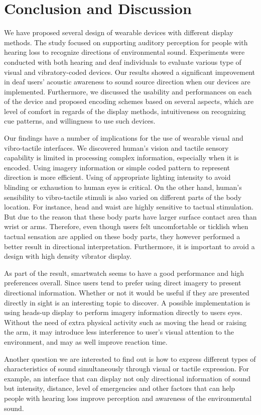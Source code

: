 \documentclass{sigchi}
\begin{document}
\section{Conclusion and Discussion}
We have proposed several design of wearable devices with different display methods. The study focused on supporting auditory perception for people with hearing loss to recognize directions of environmental sound. Experiments were conducted with both hearing and deaf individuals to evaluate various type of visual and vibratory-coded devices. Our results showed a significant improvement in deaf users' acoustic awareness to sound source direction when our devices are implemented. Furthermore, we discussed the usability and performances on each of the device and proposed encoding schemes based on several aspects, which are level of comfort in regards of the display methods, intuitiveness on recognizing cue patterns, and willingness to use such devices.

Our findings have a number of implications for the use of wearable visual and vibro-tactile interfaces. We discovered human's vision and tactile sensory capability is limited in processing complex information, especially when it is encoded. Using imagery information or simple coded pattern to represent direction is more efficient. Using of appropriate lighting intensity to avoid blinding or exhaustion to human eyes is critical. On the other hand, human's sensibility to vibro-tactile stimuli is also varied on different parts of the body location. For instance, head and waist are highly sensitive to tactual stimulation. But due to the reason that these body parts have larger surface contact area than wrist or arms. Therefore, even though users felt uncomfortable or ticklish when tactual sensation are applied on these body parts, they however performed a better result in directional interpretation. Furthermore, it is important to avoid a design with high density vibrator display.

As part of the result, smartwatch seems to have a good performance and high preferences overall. Since users tend to prefer using direct imagery to present directional information. Whether or not it would be useful if they are presented directly in sight is an interesting topic to discover. A possible implementation is using heads-up display to perform imagery information directly to users eyes. Without the need of extra physical activity such as moving the head or raising the arm, it may introduce less interference to user's visual attention to the environment, and may as well improve reaction time.

Another question we are interested to find out is how to express different types of characteristics of sound simultaneously through visual or tactile expression. For example, an interface that can display not only directional information of sound but intensity, distance, level of emergencies and other factors that can help people with hearing loss improve perception and awareness of the environmental sound.

\balance



\end{document}
